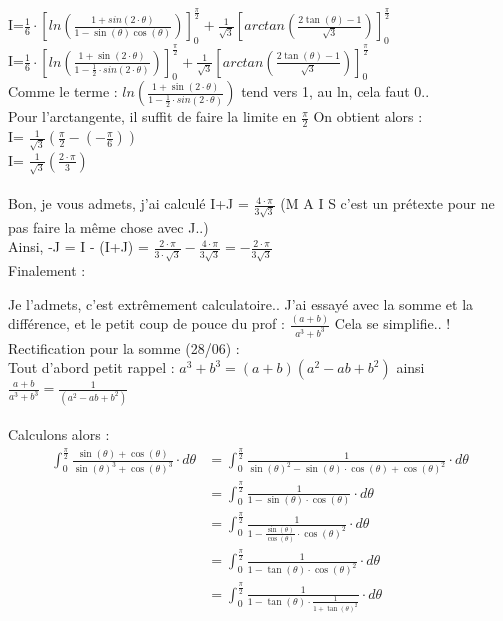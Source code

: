 \documentclass[a4paper,10pt]{article}
\begin{document}
I=$\frac{1}{6} \cdot \left[ ln(\frac{1 + sin(2 \cdot \theta)}{1-\sin(\theta)\cos(\theta)}) \right]_0^{\frac{\pi}{2}} + \frac{1}{\sqrt{3}} \left[ arctan(\frac{2\tan(\theta)-1}{\sqrt{3}}) \right]_0^{\frac{\pi}{2}} $\\
I=$\frac{1}{6} \cdot \left[ ln(\frac{1 + \sin(2 \cdot \theta)}{1-\frac{1}{2} \cdot sin(2 \cdot \theta)}) \right]_0^{\frac{\pi}{2}} + \frac{1}{\sqrt{3}} \left[ arctan(\frac{2\tan(\theta)-1}{\sqrt{3}}) \right]_0^{\frac{\pi}{2}} $\\
Comme le terme : $ln(\frac{1 + \sin(2 \cdot \theta)}{1-\frac{1}{2} \cdot sin(2 \cdot \theta)})$ tend vers 1, au ln, cela faut 0..\\
Pour l'arctangente, il suffit de faire la limite en $\frac{\pi}{2}$
On obtient alors : \\
I= $\frac{1}{\sqrt{3}} (\frac{\pi}{2} - (- \frac{\pi}{6}))$\\
I= $\frac{1}{\sqrt{3}} (\frac{2\cdot \pi}{3})$\\

\\

Bon, je vous admets, j'ai calculé I+J = $\frac{4 \cdot \pi}{3 \sqrt{3}}$ (M A I S c'est un prétexte pour ne pas faire la même chose avec J..) \\

Ainsi, -J = I - (I+J) = $\frac{2\cdot \pi}{3 \cdot \sqrt{3}} - \frac{4 \cdot \pi}{3 \sqrt{3}} =-\frac{2 \cdot \pi}{3 \sqrt{3}}$\\
Finalement : 

Je l'admets, c'est extrêmement calculatoire.. J'ai essayé avec la somme et la différence, et le petit coup de pouce du prof : $\frac{(a+b)}{a^3+b^3}$ Cela se simplifie.. ! \\

Rectification pour la somme (28/06) : \\

Tout d'abord petit rappel : $a^3 + b^3 = (a+b)(a^2-ab+b^2)$ ainsi $\frac{a+b}{a^3 + b^3}=\frac{1}{(a^2-ab+b^2)}$\\ \\
Calculons alors : 
\begin{align*}
\int_0^{\frac{\pi}{2}} \frac{\sin(\theta) + \cos(\theta)}{\sin(\theta)^3 + \cos(\theta)^3} \cdot d\theta &= \int_0^{\frac{\pi}{2}} \frac{1}{\sin(\theta)^2 - \sin(\theta) \cdot \cos(\theta) + \cos(\theta)^2} \cdot d\theta \\
&=\int_0^{\frac{\pi}{2}} \frac{1}{1 - \sin(\theta) \cdot \cos(\theta) } \cdot d\theta \\
&=\int_0^{\frac{\pi}{2}} \frac{1}{1 - \frac{\sin(\theta)}{\cos(\theta)} \cdot \cos(\theta)^2 } \cdot d\theta \\
&=\int_0^{\frac{\pi}{2}} \frac{1}{1 - \tan(\theta) \cdot \cos(\theta)^2 } \cdot d\theta \\
&=\int_0^{\frac{\pi}{2}} \frac{1}{1 - \tan(\theta) \cdot \frac{1}{1+\tan(\theta)^2} } \cdot d\theta \\
\end{align*}
\end{document}
